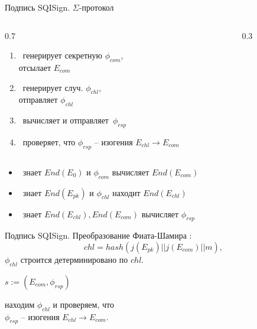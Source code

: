 \documentclass{beamer}
\begin{document}
\begin{frame}{Подпись SQISign. $\Sigma$-протокол}
\begin{columns}
	\begin{column}{0.7\textwidth}
		\begin{enumerate}
			\item \UserA~генерирует секретную $\phi_{com}$,\\
			отсылает $E_{com}$
			\item \UserB~генерирует случ. $\phi_{chl}$,\\
			отправляет $\phi_{chl}$
			\item \UserA~вычисляет и отправляет~$\phi_{rsp}$
			\item \UserB~проверяет, что $\phi_{rsp}$  -- изогения $E_{chl} \rightarrow E_{com}$
		\end{enumerate}
	\end{column}
	\begin{column}{0.3\textwidth}
		
	\end{column}
\end{columns}
\pause
\vspace{1em}
\begin{itemize}
	\item \UserA~знает $End(E_0)$ и $\phi_{com}$ \structure{$\implies$} вычисляет $End(E_{com})$
	\item \UserA~знает $End(E_{pk})$ и $\phi_{chl}$ \structure{$\implies$} находит $End(E_{chl})$
	\item \UserA~знает $End(E_{chl}), End(E_{com})$ \structure{$\implies$} вычисляет $\phi_{rsp}$
\end{itemize}
\end{frame}


\begin{frame}{Подпись SQISign. Преобразование Фиата-Шамира}
	:
		\[
		chl = hash(j(E_{pk}) || j(E_{com}) || m),
		\]$
		\phi_{chl}$ строится детерминировано по $chl$.
		\vspace{1em}
		
		 $s := (E_{com}, \phi_{rsp})$
		\vspace{1em}
		
		 находим $\phi_{chl}$ и проверяем, что\\ $\phi_{rsp}$ -- изогения $E_{chl} \rightarrow E_{com}$.
\end{frame}
\end{document}
